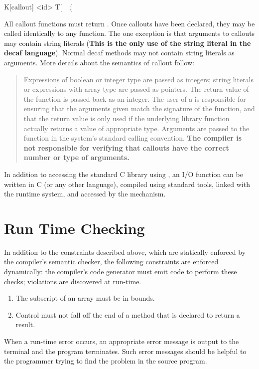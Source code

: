 {\bnf  K[callout] <id> T[~~;] }

All callout functions must return . Once callouts have been declared, they may be called identically to any
function. The one exception is that arguments to callouts may contain string literals (\textbf{This is the only use of
the string literal in the decaf language}). Normal decaf methods may not contain string literals as arguments. More
details about the semantics of callout follow:

\begin{quotation}
Expressions of boolean or integer type are passed as integers;
string literals or expressions with array type are passed as
pointers. The return value of the function is passed back as an
integer. The user of a  is responsible for ensuring that the
arguments given match the signature of the function, and that the return
value is only used if the underlying library function actually returns a
value of appropriate type. Arguments are passed to the function in the
system's standard calling convention. \textbf{The compiler is not responsible for verifying that callouts have the
correct number or type of arguments.}
\end{quotation}

In addition to accessing the standard C library using , an
I/O function can be written in C (or any other language), compiled using
standard tools, linked with the runtime system, and accessed by the
 mechanism.



\section*{Run Time Checking}

In addition to the constraints described above, which are statically
enforced by the compiler's semantic checker, the following constraints
are enforced dynamically: the compiler's code generator must emit
code to perform these checks; violations are discovered at run-time.

\begin{enumerate}
\item The subscript of an array must be in bounds.
\item Control must not fall off the end of a method that is declared to
      return a result.
\end{enumerate}

When a run-time error occurs, an appropriate error message is output to
the terminal and the program terminates.  Such error messages should be
helpful to the programmer trying to find the problem in the source
program.


